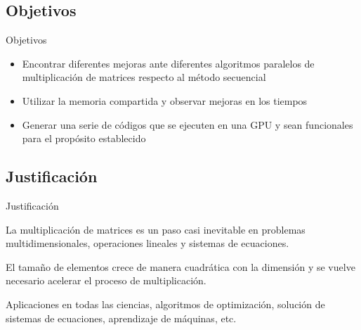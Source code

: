 \documentclass{beamer}
\begin{document}
\subsection{Objetivos}
\begin{frame}{Objetivos}
	\begin{block}{}
		\begin{itemize}
			\item Encontrar diferentes mejoras ante diferentes algoritmos paralelos de multiplicación de matrices respecto al método secuencial
			\item Utilizar la memoria compartida y observar mejoras en los tiempos
			\item Generar una serie de códigos que se ejecuten en una GPU y sean funcionales para el propósito establecido
		\end{itemize}
	\end{block}
\end{frame}
\subsection{Justificación}
\begin{frame}{Justificación}
	\begin{block}{}
		La multiplicación de matrices es un paso casi inevitable en problemas multidimensionales, operaciones lineales y sistemas de ecuaciones.
	\end{block}
	\begin{block}{}
		El tamaño de elementos crece de manera cuadrática con la dimensión y se vuelve necesario acelerar el proceso de multiplicación. 
	\end{block}
	\begin{block}{}
		Aplicaciones en todas las ciencias, algoritmos de optimización, solución de sistemas de ecuaciones, aprendizaje de máquinas, etc.
	\end{block}
\end{frame}

\end{document}
